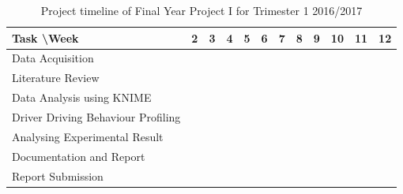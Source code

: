 \begin{table}[h!]
\begin{tabular}{|l|c|c|c|c|c|c|c|c|c|c|c|}
\hline
Task \textbackslash Week & 2 & 3 & 4 & 5 & 6 & 7 & 8 & 9 & 10 & 11 & 12 \\

\hline
Data Acquisition &  \cellcolor[HTML]{000000} & \cellcolor[HTML]{000000} & \cellcolor[HTML]{000000} & \cellcolor[HTML]{000000} & \cellcolor[HTML]{000000} & & & & & & \\

\hline
Literature Review & & \cellcolor[HTML]{000000} & \cellcolor[HTML]{000000} & \cellcolor[HTML]{000000} & \cellcolor[HTML]{000000} & & & & & & \\

\hline
Data Analysis using KNIME & & & & & & \cellcolor[HTML]{000000} & \cellcolor[HTML]{000000} & \cellcolor[HTML]{000000} & & & \\

\hline
Driver Driving Behaviour Profiling & & & & & & & & \cellcolor[HTML]{000000} & \cellcolor[HTML]{000000} &  & \\

\hline
Analysing Experimental Result & & & & & & & & & \cellcolor[HTML]{000000} & \cellcolor[HTML]{000000} & \\

\hline
Documentation and Report & & & & & & & & & \cellcolor[HTML]{000000} & \cellcolor[HTML]{000000} & \cellcolor[HTML]{000000} \\

\hline
Report Submission & & & & & & & & & & & \cellcolor[HTML]{000000}\\

\hline
\end{tabular}
\label{tbl:gantt1}
\caption{Project timeline of Final Year Project I for Trimester 1 2016/2017}
\end{table}